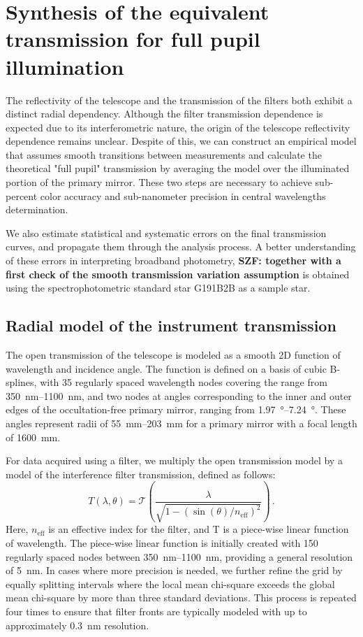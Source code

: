 \section{Synthesis of the equivalent transmission for full pupil illumination}
\label{sec:pupil_stitching}

The reflectivity of the telescope and the transmission of the filters
both exhibit a distinct radial dependency. Although the filter
transmission dependence is expected due to its interferometric nature,
the origin of the telescope reflectivity dependence remains
unclear. Despite of this, we can construct an empirical model that
assumes smooth transitions between measurements and calculate the
theoretical "full pupil" transmission by averaging the model over the
illuminated portion of the primary mirror. These two steps are
necessary to achieve sub-percent color accuracy and sub-nanometer
precision in central wavelengths determination.

We also estimate statistical and systematic errors on the final
transmission curves, and propagate them through the analysis process. A
better understanding of these errors in interpreting broadband
photometry, \textbf{SZF: together with a first check of the smooth transmission variation assumption} is obtained using the spectrophotometric standard star
G191B2B as a sample star.


\subsection{Radial model of the instrument transmission}
\label{sec:model}

The open transmission of the telescope is modeled as a smooth 2D
function of wavelength and incidence angle. The function is defined on
a basis of cubic B-splines, with \num{35} regularly spaced wavelength
nodes covering the range from \SIrange{350}{1100}{nm}, and two nodes
at angles corresponding to the inner and outer edges of the
occultation-free primary mirror, ranging from \SIrange{1.97}{7.24}
{\degree}. These angles represent radii of \SIrange{55}{203}{mm} for a
primary mirror with a focal length of \SI{1600}{mm}.

For data acquired using a filter, we multiply the open transmission
model by a model of the interference filter transmission, defined as
follows:
\begin{equation}
  \label{eq:filtertransmission}
T(\lambda, \theta) = \mathcal T\left(\frac{\lambda}{\sqrt{1 -
    (\sin(\theta) / n_\text{eff})^2}}\right)\,.
\end{equation}
Here, $n_\text{eff}$ is an effective index for the filter,
and T is a piece-wise linear function of wavelength. The piece-wise
linear function is initially created with \num{150} regularly spaced
nodes between \SIrange{350}{1100}{nm}, providing a general resolution
of \SI{5}{nm}. In cases where more precision is needed, we further
refine the grid by equally splitting intervals where the local mean
chi-square exceeds the global mean chi-square by more than three
standard deviations. This process is repeated four times to ensure
that filter fronts are typically modeled with up to approximately
\SI{0.3}{nm} resolution.


